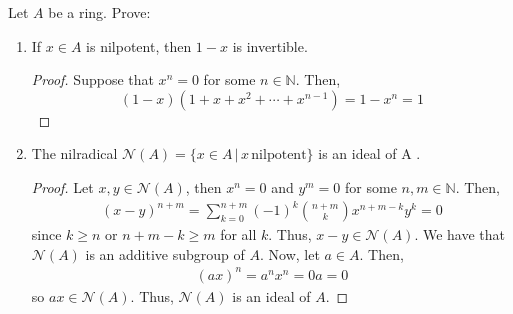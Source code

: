 \begin{problem}
    Let $A$ be a ring.
    Prove:
    \begin{enumerate}[label=(\theproblem.\arabic*),ref=\theproblem.\arabic*]

        \item \label{itm:1_minus_x_invertible} If $x \in A$ is nilpotent, then $1 - x$ is invertible.
            \begin{sol}
            \begin{proof}
                 Suppose that $x^n=0$ for some $n \in \mathbb{N}$.
                 Then, \[(1-x)(1+x+x^2+\cdots+x^{n-1}) = 1-x^{n} = 1\]
            \end{proof}
            \end{sol}

        \item \label{itm:nilradical_is_ideal} The nilradical $\mathcal{N}(A) = \{x \in A \, | \, x \, \text{nilpotent}\}$ is an ideal of A .
            \begin{sol}
            \begin{proof}
                Let $x,y \in \mathcal{N}(A)$, then $x^n = 0$ and $y^m = 0$ for some $n,m \in \mathbb{N}$.
                Then,
                    \begin{align*}
                        (x-y)^{n+m} = \sum_{k=0}^{n+m} (-1)^{k} \binom{n+m}{k} x^{n+m-k} y^{k} = 0
                    \end{align*}
                since $k \geq n$ or $n+m-k \geq m$ for all $k$.
                Thus, $x-y \in \mathcal{N}(A)$.
                We have that $\mathcal{N}(A)$ is an additive subgroup of $A$.
                Now, let $a \in A$.
                Then,
                    \begin{align*}
                        (ax)^n = a^n x^n = 0a = 0
                    \end{align*}
                so $ax \in \mathcal{N}(A)$.
                Thus, $\mathcal{N}(A)$ is an ideal of $A$.
            \end{proof}
            \end{sol}


\end{enumerate}
\end{problem}
